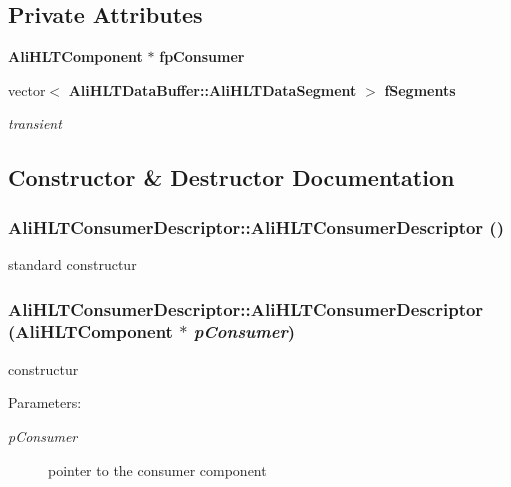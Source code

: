 \subsection*{Private Attributes}
\begin{CompactItemize}
\item 
{\bf Ali\-HLTComponent} $\ast$ {\bf fp\-Consumer}
\item 
vector$<$ {\bf Ali\-HLTData\-Buffer::Ali\-HLTData\-Segment} $>$ {\bf f\-Segments}
\begin{CompactList}\small\item\em transient \item\end{CompactList}\end{CompactItemize}


\subsection{Constructor \& Destructor Documentation}
\subsubsection{\setlength{\rightskip}{0pt plus 5cm}Ali\-HLTConsumer\-Descriptor::Ali\-HLTConsumer\-Descriptor ()}\label{classAliHLTConsumerDescriptor_a0}


standard constructur 
\subsubsection{\setlength{\rightskip}{0pt plus 5cm}Ali\-HLTConsumer\-Descriptor::Ali\-HLTConsumer\-Descriptor ({\bf Ali\-HLTComponent} $\ast$ {\em p\-Consumer})}\label{classAliHLTConsumerDescriptor_a1}


constructur \begin{Desc}
\item[Parameters:]
\begin{description}
\item[{\em p\-Consumer}]pointer to the consumer component \end{description}
\end{Desc}



